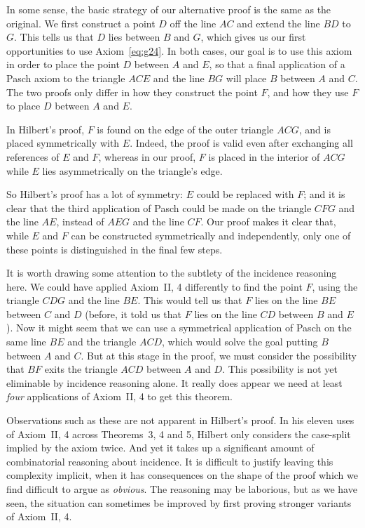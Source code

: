 In some sense, the basic strategy of our alternative proof is the same as the original. We first construct a point $D$ off the line $AC$ and extend the line $BD$ to $G$. This tells us that $D$ lies between $B$ and $G$, which gives us our first opportunities to use Axiom~\ref{eq:g24}. In both cases, our goal is to use this axiom in order to place the point $D$ between $A$ and $E$, so that a final application of a Pasch axiom to the triangle $ACE$ and the line $BG$ will place $B$ between $A$ and $C$. The two proofs only differ in how they construct the point $F$, and how they use $F$ to place $D$ between $A$ and $E$.

In Hilbert's proof, $F$ is found on the edge of the outer triangle $ACG$, and is placed symmetrically with $E$. Indeed, the proof is valid even after exchanging all references of $E$ and $F$, whereas in our proof, $F$ is placed in the interior of $ACG$ while $E$ lies asymmetrically on the triangle's edge. 

So Hilbert's proof has a lot of symmetry: $E$ could be replaced with $F$; and it is clear that the third application of Pasch could be made on the triangle $CFG$ and the line $AE$, instead of $AEG$ and the line $CF$. Our proof makes it clear that, while $E$ and $F$ can be constructed symmetrically and independently, only one of these points is distinguished in the final few steps. 

It is worth drawing some attention to the subtlety of the incidence reasoning here. We could have applied Axiom~II, 4 differently to find the point $F$, using the triangle $CDG$ and the line $BE$. This would tell us that $F$ lies on the line $BE$ between $C$ and $D$ (before, it told us that $F$ lies on the line $CD$ between $B$ and $E$). Now it might seem that we can use a symmetrical application of Pasch on the same line $BE$ and the triangle $ACD$, which would solve the goal putting $B$ between $A$ and $C$. But at this stage in the proof, we must consider the possibility that $BF$ exits the triangle $ACD$ between $A$ and $D$. This possibility is not yet eliminable by incidence reasoning alone. It really does appear we need at least \emph{four} applications of Axiom~II, 4 to get this theorem.

Observations such as these are not apparent in Hilbert's proof. In his eleven uses of Axiom~II, 4 across Theorems~3, 4 and 5, Hilbert only considers the case-split implied by the axiom twice. And yet it takes up a significant amount of combinatorial reasoning about incidence. It is difficult to justify leaving this complexity implicit, when it has consequences on the shape of the proof which we find difficult to argue as \emph{obvious}. The reasoning may be laborious, but as we have seen, the situation can sometimes be improved by first proving stronger variants of Axiom~II, 4.

